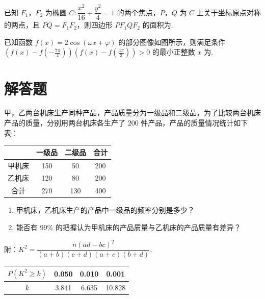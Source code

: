\begin{problem}
已知 \(F_1\)，\(F_2\) 为椭圆 \(C:\dfrac{x^2}{16}+\dfrac{y^2}{4}=1\) 的两个焦点，\(P\)，\(Q\) 为 \(C\) 上关于坐标原点对称的两点，且 \(PQ=F_1F_2\)，则四边形 \(PF_1QF_2\) 的面积为\fillinblank{}.

\end{problem}

\begin{problem}
已知函数 \(f(x)=2\cos (\omega x+\varphi)\) 的部分图像如图所示，则满足条件 \(\left( f(x)-f\left( -\frac{7\pi}{4} \right) \right)\allowbreak\left( f(x)-f\left( \frac{4\pi}{3} \right) \right)>0\) 的最小正整数 \(x\) 为\fillinblank{}.


\end{problem}

\section{解答题}

\begin{problem}
甲，乙两台机床生产同种产品，产品质量分为一级品和二级品，为了比较两台机床产品的质量，分别用两台机床各生产了 \(200\) 件产品，产品的质量情况统计如下表：

\begin{center}
\begin{tabular}{c|ccc}
\hline
& 一级品 & 二级品 & 合计 \\
\hline
甲机床 & 150 & 50 & 200 \\
乙机床 & 120 & 80 & 200 \\
合计 & 270 & 130 & 400 \\
\hline
\end{tabular}
\end{center}

\begin{enumerate}
\item 甲机床，乙机床生产的产品中一级品的频率分别是多少？
\item 能否有 \(99\%\) 的把握认为甲机床的产品质量与乙机床的产品质量有差异？
\end{enumerate}

附：\(K^2=\dfrac{n(ad-bc)^2}{(a+b)(c+d)(a+c)(b+d)}\).

\begin{center}
\begin{tabular}{c|ccc}
\hline
\(P(K^2\ge k)\) & 0.050 & 0.010 & 0.001 \\
\hline
\(k\) & 3.841 & 6.635 & 10.828 \\
\hline
\end{tabular}
\end{center}
\end{problem}

